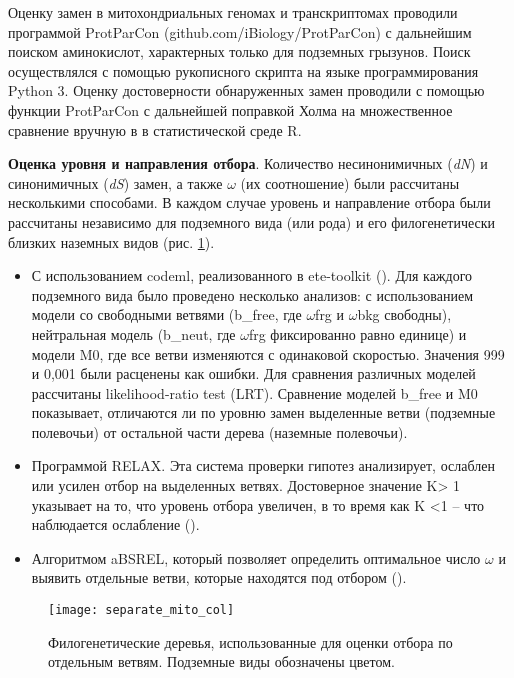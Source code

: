 Оценку замен в митохондриальных геномах и транскриптомах проводили программой ProtParCon (github.com/iBiology/ProtParCon) с дальнейшим поиском аминокислот, характерных только для подземных грызунов. Поиск осуществлялся с помощью рукописного скрипта на языке программирования Python 3. Оценку достоверности обнаруженных замен проводили с помощью функции ProtParCon с дальнейшей поправкой Холма на множественное сравнение вручную в в статистической среде R. 

\textbf{Оценка уровня и направления отбора}. Количество несинонимичных (\textit{dN}) и синонимичных (\textit{dS}) замен, а также $\omega$ (их соотношение) были рассчитаны несколькими способами. В каждом случае уровень и направление отбора были рассчитаны независимо для подземного вида (или рода) и его филогенетически близких наземных видов (рис. \ref{tree_mito}). 
\begin{itemize}
	\item[\textbullet] С использованием codeml, реализованного в ete-toolkit (\cite{Huerta-Cepas2016}). Для каждого подземного вида было проведено несколько анализов: с использованием модели со свободными ветвями (b\_free, где $\omega$frg и $\omega$bkg свободны), нейтральная модель (b\_neut, где $\omega$frg фиксированно равно единице) и модели M0, где все ветви изменяются с одинаковой скоростью. Значения 999 и 0,001 были расценены как ошибки. Для сравнения различных моделей рассчитаны likelihood-ratio test (LRT). Сравнение моделей b\_free и M0 показывает, отличаются ли по уровню замен выделенные ветви (подземные полевочьи) от остальной части дерева (наземные полевочьи). 
	\item[\textbullet] Программой RELAX. Эта система проверки гипотез анализирует, ослаблен или усилен отбор на выделенных ветвях. Достоверное значение K> 1 указывает на то, что уровень отбора увеличен, в то время как K <1 -- что наблюдается ослабление (\cite{Wertheim2015}).
	\item[\textbullet] Алгоритмом aBSREL, который позволяет определить оптимальное число $\omega$ и выявить отдельные ветви, которые находятся под отбором (\cite{Smith2015}).     
\end{itemize}

\begin{figure}[h!]
	\begin{center}
		\texttt{[image: separate\_mito\_col]}
	\end{center}
	\caption{Филогенетические деревья, использованные для оценки отбора по отдельным ветвям. Подземные виды обозначены цветом.}
	\label{tree_mito}
\end{figure}

